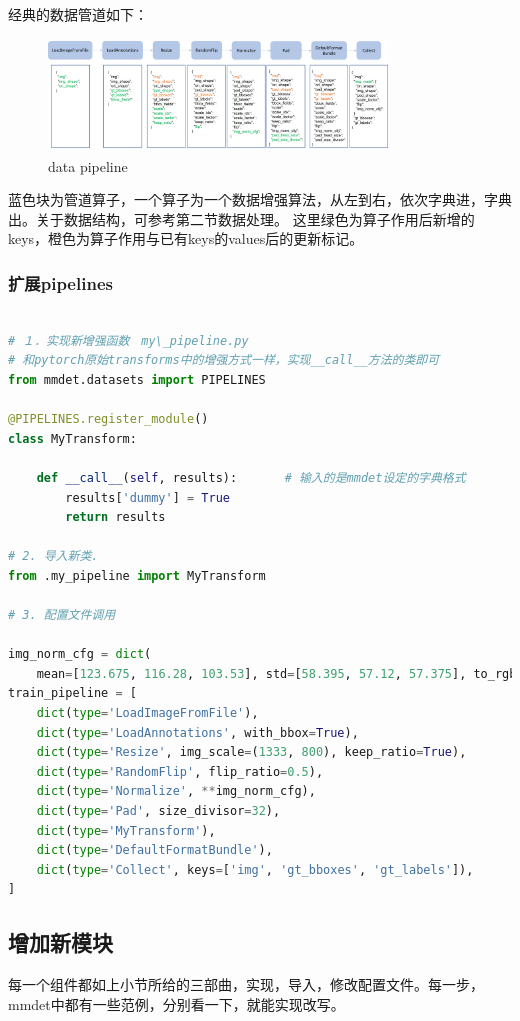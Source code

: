 \documentclass[UTF8]{ctexart}
\begin{document}
经典的数据管道如下：
\begin{figure}[htbp]
	\centering
	\includegraphics[width=9cm, height=3cm]{./pic/data_pipeline.png}
	\caption{ data pipeline }
\end{figure}

蓝色块为管道算子，一个算子为一个数据增强算法，从左到右，依次字典进，字典出。关于数据结构，可参考第二节数据处理。
这里绿色为算子作用后新增的keys，橙色为算子作用与已有keys的values后的更新标记。


\subsubsection{扩展pipelines}

\lstset{style=mystyle}
\begin{lstlisting}[language=Python]

# １．实现新增强函数　my\_pipeline.py
# 和pytorch原始transforms中的增强方式一样，实现__call__方法的类即可
from mmdet.datasets import PIPELINES

@PIPELINES.register_module()
class MyTransform:

    def __call__(self, results):　　　　# 输入的是mmdet设定的字典格式
        results['dummy'] = True
		return results
		
# 2. 导入新类.
from .my_pipeline import MyTransform

# 3. 配置文件调用

img_norm_cfg = dict(
    mean=[123.675, 116.28, 103.53], std=[58.395, 57.12, 57.375], to_rgb=True)
train_pipeline = [
    dict(type='LoadImageFromFile'),
    dict(type='LoadAnnotations', with_bbox=True),
    dict(type='Resize', img_scale=(1333, 800), keep_ratio=True),
    dict(type='RandomFlip', flip_ratio=0.5),
    dict(type='Normalize', **img_norm_cfg),
    dict(type='Pad', size_divisor=32),
    dict(type='MyTransform'),
    dict(type='DefaultFormatBundle'),
    dict(type='Collect', keys=['img', 'gt_bboxes', 'gt_labels']),
]
\end{lstlisting}


\subsection{增加新模块}
每一个组件都如上小节所给的三部曲，实现，导入，修改配置文件。每一步，mmdet中都有一些范例，分别看一下，就能实现改写。
\end{document}
